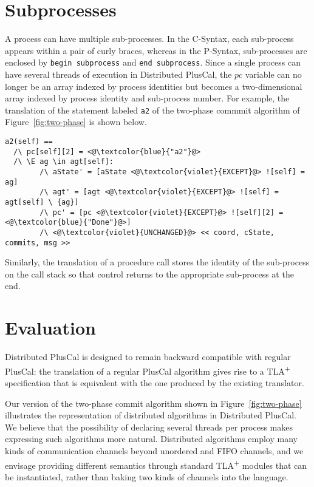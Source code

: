 \documentclass{article}
\newcommand{\tlaplus}{TLA\textsuperscript{+}\xspace}
\begin{document}
\section{Subprocesses}

A process can have multiple sub-processes. In the C-Syntax, each sub-process appears within a pair of curly braces, whereas in the P-Syntax, sub-processes are enclosed by \verb|begin subprocess| and \verb|end subprocess|. Since a single process can have several threads of execution in Distributed PlusCal, the $pc$ variable can no longer be an array indexed by process identities but becomes a two-dimensional array indexed by process identity and sub-process number. For example, the translation of the statement labeled \verb|a2| of the two-phase commmit algorithm of Figure~\ref{fig:two-phase} is shown below.

\begin{lstlisting}[language=pluscal,frame = tlrb, numbers=none]  
a2(self) == 
  /\ pc[self][2] = <@\textcolor{blue}{"a2"}@>
  /\ \E ag \in agt[self]:
        /\ aState' = [aState <@\textcolor{violet}{EXCEPT}@> ![self] = ag]
        /\ agt' = [agt <@\textcolor{violet}{EXCEPT}@> ![self] = agt[self] \ {ag}]
        /\ pc' = [pc <@\textcolor{violet}{EXCEPT}@> ![self][2] =  <@\textcolor{blue}{"Done"}@>]
        /\ <@\textcolor{violet}{UNCHANGED}@> << coord, cState, commits, msg >>
\end{lstlisting}

Similarly, the translation of a procedure call stores the identity of the sub-process on the call stack so that control returns to the appropriate sub-process at the end.


\section{Evaluation}

Distributed PlusCal is designed to remain backward compatible with regular PlusCal: the translation of a regular PlusCal algorithm gives rise to a \tlaplus specification that is equivalent with the one produced by the existing translator.

Our version of the two-phase commit algorithm shown in Figure~\ref{fig:two-phase} illustrates the representation of distributed algorithms in Distributed PlusCal. We believe that the possibility of declaring several threads per process makes expressing such algorithms more natural. Distributed algorithms employ many kinds of communication channels beyond unordered and FIFO channels, and we envisage providing different semantics through standard \tlaplus modules that can be instantiated, rather than baking two kinds of channels into the language.
\end{document}
